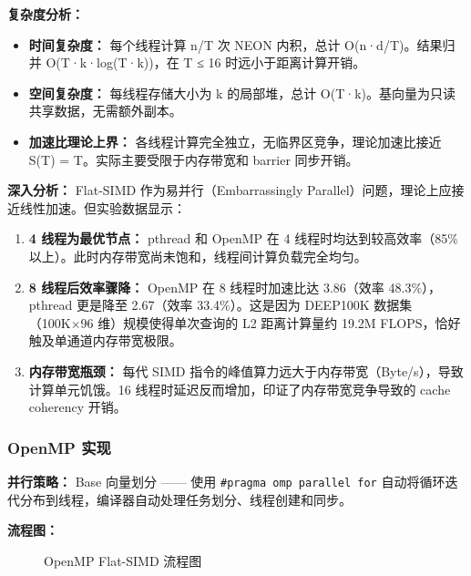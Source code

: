 \documentclass[a4paper]{article}
\begin{document}
\textbf{复杂度分析：}

\begin{itemize}
\item \textbf{时间复杂度：} 每个线程计算 n/T 次 NEON 内积，总计 O(n·d/T)。结果归并 O(T·k·log(T·k))，在 T ≤ 16 时远小于距离计算开销。
\item \textbf{空间复杂度：} 每线程存储大小为 k 的局部堆，总计 O(T·k)。基向量为只读共享数据，无需额外副本。
\item \textbf{加速比理论上界：} 各线程计算完全独立，无临界区竞争，理论加速比接近 S(T) = T。实际主要受限于内存带宽和 barrier 同步开销。
\end{itemize}

\textbf{深入分析：} Flat-SIMD 作为易并行（Embarrassingly Parallel）问题，理论上应接近线性加速。但实验数据显示：

\begin{enumerate}
\item \textbf{4 线程为最优节点：} pthread 和 OpenMP 在 4 线程时均达到较高效率（85\%以上）。此时内存带宽尚未饱和，线程间计算负载完全均匀。
\item \textbf{8 线程后效率骤降：} OpenMP 在 8 线程时加速比达 3.86（效率 48.3\%），pthread 更是降至 2.67（效率 33.4\%）。这是因为 DEEP100K 数据集（100K×96 维）规模使得单次查询的 L2 距离计算量约 19.2M FLOPS，恰好触及单通道内存带宽极限。
\item \textbf{内存带宽瓶颈：} 每代 SIMD 指令的峰值算力远大于内存带宽（Byte/s），导致计算单元饥饿。16 线程时延迟反而增加，印证了内存带宽竞争导致的 cache coherency 开销。
\end{enumerate}

\subsubsection{OpenMP 实现}

\textbf{并行策略：} Base 向量划分 —— 使用 \texttt{\#pragma omp parallel for} 自动将循环迭代分布到线程，编译器自动处理任务划分、线程创建和同步。

\textbf{流程图：}

\begin{figure}[htbp]
\centering
{}
\caption{OpenMP Flat-SIMD 流程图}
\end{figure}
\end{document}

